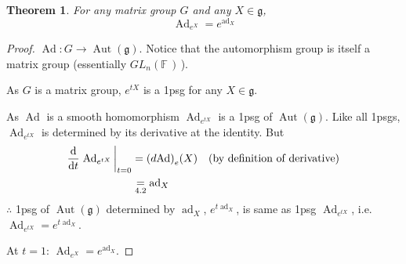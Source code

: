 \documentclass[12pt,a4paper]{article}
\newcommand{\fF}{\ensuremath{\mathbb{F}\,}}
\newcommand{\dg}[1]{\ensuremath{d {#1}}}
\newcommand{\glnff}{\ensuremath{GL_n(\fF)\,}}
\newcommand{\lalg}{\ensuremath{\mathfrak{g}}}
\newcommand{\Ad}{\ensuremath{\operatorname{Ad}}}
\newcommand{\Adh}[1]{\ensuremath{\operatorname{Ad}_{#1}}}
\newcommand{\adx}{\ensuremath{\operatorname{ad}_X}}
\newtheorem{thm}{Theorem}[subsubsection]
\begin{document}
\addtocounter{thm}{1}
\begin{thm}
For any matrix group $G$ and any $X\in \lalg$, 
\[\Adh{e^X}=e^{\adx}\]
\end{thm}
\begin{proof}
$\Ad:G\to \operatorname{Aut}(\lalg)$. Notice that the automorphism group is itself a matrix group (essentially \glnff).

As $G$ is a matrix group, $e^{tX}$ is a 1psg for any $X\in \lalg$.

As $\Ad$ is a smooth homomorphism $\Adh{e^{tX}}$ is a 1psg of $\operatorname{Aut}(\lalg)$. Like all 1psgs, $\Adh{e^{tX}}$ is determined by its derivative at the identity. But
\begin{align*}
\dv{t}\eval{\Adh{e^{tX}}}_{t=0}&=\qty(\dg{\Ad})_e (X) \quad \text{(by definition of derivative)}\\
&\underset{4.2}{=}\adx
\end{align*}
$\therefore$ 1psg of $\operatorname{Aut}(\lalg)$ determined by $\adx$, $e^{t\adx}$, is same as 1psg $\Adh{e^{tX}}$, i.e. $\Adh{e^{tX}}=e^{t\adx}$. 

At $t=1$: $\Adh{e^X}=e^{\adx}$.
\end{proof}
\end{document}
